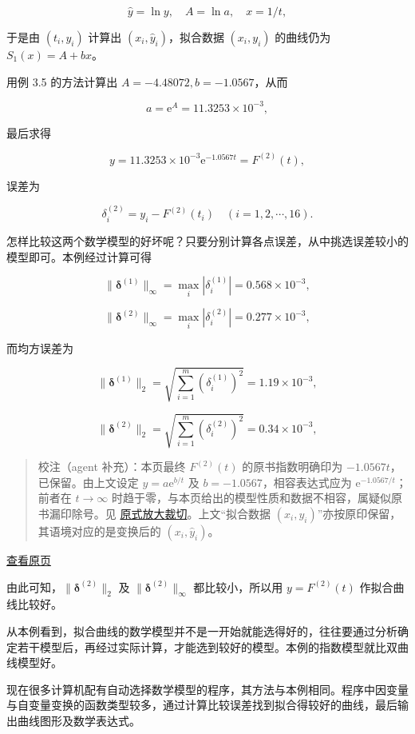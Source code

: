 \documentclass[
  10pt,
  fontset=fandol]{ctexart}
\begin{document}
\[
\hat y=\ln y,\quad A=\ln a,\quad x=1/t,
\]

于是由 \((t_i,y_i)\) 计算出 \((x_i,\hat y_i)\)，拟合数据 \((x_i,y_i)\) 的曲线仍为 \(S_1(x)=A+bx\)。

用例 3.5 的方法计算出 \(A=-4.48072,b=-1.0567\)，从而

\[
a=\mathrm e^A=11.3253\times10^{-3},
\]

最后求得

\[
y=11.3253\times10^{-3}\mathrm e^{-1.0567t}=F^{(2)}(t),
\]

误差为

\[
\delta_i^{(2)}=y_i-F^{(2)}(t_i)\quad(i=1,2,\cdots,16).
\]

怎样比较这两个数学模型的好坏呢？只要分别计算各点误差，从中挑选误差较小的模型即可。本例经过计算可得

\[
\|\boldsymbol\delta^{(1)}\|_\infty=\max_i|\delta_i^{(1)}|=0.568\times10^{-3},
\]

\[
\|\boldsymbol\delta^{(2)}\|_\infty=\max_i|\delta_i^{(2)}|=0.277\times10^{-3},
\]

而均方误差为

\[
\|\boldsymbol\delta^{(1)}\|_2=\sqrt{\sum_{i=1}^m(\delta_i^{(1)})^2}=1.19\times10^{-3},
\]

\[
\|\boldsymbol\delta^{(2)}\|_2=\sqrt{\sum_{i=1}^m(\delta_i^{(2)})^2}=0.34\times10^{-3},
\]

\begin{quote}
校注（agent 补充）：本页最终 \(F^{(2)}(t)\) 的原书指数明确印为 \(-1.0567t\)，已保留。由上文设定 \(y=a\mathrm e^{b/t}\) 及 \(b=-1.0567\)，相容表达式应为 \(\mathrm e^{-1.0567/t}\)；前者在 \(t\to\infty\) 时趋于零，与本页给出的模型性质和数据不相容，属疑似原书漏印除号。见 \href{../assets/ch03b/p081-exponential-fit.png}{原式放大裁切}。上文``拟合数据 \((x_i,y_i)\)''亦按原印保留，其语境对应的是变换后的 \((x_i,\hat y_i)\)。
\end{quote}

\href{../../source-images/pdf-082.jpeg}{查看原页}

由此可知，\(\|\boldsymbol\delta^{(2)}\|_2\) 及 \(\|\boldsymbol\delta^{(2)}\|_\infty\) 都比较小，所以用 \(y=F^{(2)}(t)\) 作拟合曲线比较好。

从本例看到，拟合曲线的数学模型并不是一开始就能选得好的，往往要通过分析确定若干模型后，再经过实际计算，才能选到较好的模型。本例的指数模型就比双曲线模型好。

现在很多计算机配有自动选择数学模型的程序，其方法与本例相同。程序中因变量与自变量变换的函数类型较多，通过计算比较误差找到拟合得较好的曲线，最后输出曲线图形及数学表达式。
\end{document}
